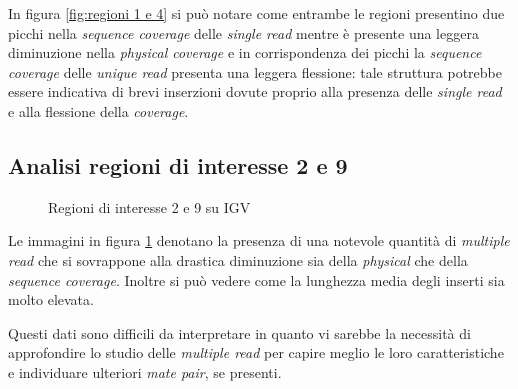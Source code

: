 In figura \ref{fig:regioni 1 e 4} si può notare come entrambe le regioni presentino due picchi nella \emph{sequence coverage} delle \emph{single read} mentre è presente una leggera diminuzione nella \emph{physical coverage} e in corrispondenza dei picchi la \emph{sequence coverage} delle \emph{unique read} presenta una leggera flessione: tale struttura potrebbe essere indicativa di brevi inserzioni dovute proprio alla presenza delle \emph{single read} e alla flessione della \emph{coverage}.

\subsection{Analisi regioni di interesse 2 e 9}
\begin{figure}[htbp]
\centering
{} \quad
{}
\caption{Regioni di interesse 2 e 9 su IGV}
\label{fig:regioni 2 e 9}
\end{figure}

Le immagini in figura \ref{fig:regioni 2 e 9} denotano la presenza di una notevole quantità di \emph{multiple read} che si sovrappone alla drastica diminuzione sia della \emph{physical} che della \emph{sequence coverage}.
Inoltre si può vedere come la lunghezza media degli inserti sia molto elevata.

Questi dati sono difficili da interpretare in quanto vi sarebbe la necessità di approfondire lo studio delle \emph{multiple read} per capire meglio le loro caratteristiche e individuare ulteriori \emph{mate pair}, se presenti.

